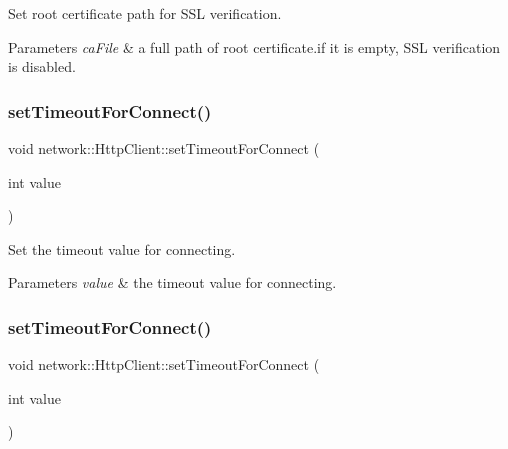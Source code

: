 Set root certificate path for S\+SL verification.


\begin{DoxyParams}{Parameters}
{\em ca\+File} & a full path of root certificate.\+if it is empty, S\+SL verification is disabled. \\
\hline
\end{DoxyParams}
\mbox{\label{classnetwork_1_1HttpClient_a1cf782d82d843941ea049e6fe8d6d231}} 
\subsubsection{\texorpdfstring{set\+Timeout\+For\+Connect()}{setTimeoutForConnect()}\hspace{0.1cm}{\footnotesize\ttfamily [1/2]}}
{\footnotesize\ttfamily void network\+::\+Http\+Client\+::set\+Timeout\+For\+Connect (\begin{DoxyParamCaption}\item[{int}]{value }\end{DoxyParamCaption})}

Set the timeout value for connecting.


\begin{DoxyParams}{Parameters}
{\em value} & the timeout value for connecting. \\
\hline
\end{DoxyParams}
\mbox{\label{classnetwork_1_1HttpClient_a1cf782d82d843941ea049e6fe8d6d231}} 
\subsubsection{\texorpdfstring{set\+Timeout\+For\+Connect()}{setTimeoutForConnect()}\hspace{0.1cm}{\footnotesize\ttfamily [2/2]}}
{\footnotesize\ttfamily void network\+::\+Http\+Client\+::set\+Timeout\+For\+Connect (\begin{DoxyParamCaption}\item[{int}]{value }\end{DoxyParamCaption})}

